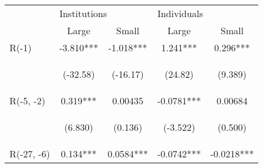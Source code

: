 \documentclass[border=0.2cm]{standalone}
\begin{document}
\begin{tabular}{lcccc}
    \toprule
                      & \multicolumn{2}{l}{Institutions}                & \multicolumn{2}{l}{Individuals}                                                                                                                  \\
    \cmidrule(l){2-3} \cmidrule(l){4-5}
    \vspace{4pt}      & Large                                           & Small                                          & Large                                          & Small                                          \\
    \midrule
    R(-1)             & -3.810***                                       & -1.018***                                      & 1.241***                                       & 0.296***                                       \\
    \vspace{4pt}      & \begin{footnotesize}(-32.58)\end{footnotesize}  & \begin{footnotesize}(-16.17)\end{footnotesize} & \begin{footnotesize}(24.82)\end{footnotesize}  & \begin{footnotesize}(9.389)\end{footnotesize}  \\
    R(-5, -2)         & 0.319***                                        & 0.00435                                        & -0.0781***                                     & 0.00684                                        \\
    \vspace{4pt}      & \begin{footnotesize}(6.830)\end{footnotesize}   & \begin{footnotesize}(0.136)\end{footnotesize}  & \begin{footnotesize}(-3.522)\end{footnotesize} & \begin{footnotesize}(0.500)\end{footnotesize}  \\
    R(-27, -6)        & 0.134***                                        & 0.0584***                                      & -0.0742***                                     & -0.0218***                                     \\

\end{tabular}
\end{document}
